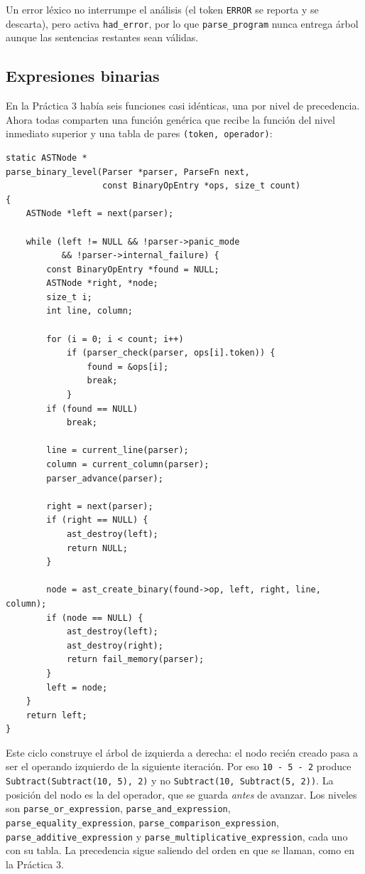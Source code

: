 \documentclass[12pt,letterpaper]{article}
\begin{document}
\bigskip

Un error léxico no interrumpe el análisis (el token \texttt{ERROR} se reporta y se descarta), pero activa
\texttt{had\_error}, por lo que \texttt{parse\_program} nunca entrega árbol aunque las sentencias restantes
sean válidas.

\subsection*{Expresiones binarias}

En la Práctica 3 había seis funciones casi idénticas, una por nivel de precedencia. Ahora todas comparten una
función genérica que recibe la función del nivel inmediato superior y una tabla de pares
\texttt{(token, operador)}:

\begin{lstlisting}[style=modernc, caption={\texttt{parse\_binary\_level}, núcleo de las expresiones binarias.}]
static ASTNode *
parse_binary_level(Parser *parser, ParseFn next,
                   const BinaryOpEntry *ops, size_t count)
{
    ASTNode *left = next(parser);

    while (left != NULL && !parser->panic_mode
           && !parser->internal_failure) {
        const BinaryOpEntry *found = NULL;
        ASTNode *right, *node;
        size_t i;
        int line, column;

        for (i = 0; i < count; i++)
            if (parser_check(parser, ops[i].token)) {
                found = &ops[i];
                break;
            }
        if (found == NULL)
            break;

        line = current_line(parser);
        column = current_column(parser);
        parser_advance(parser);

        right = next(parser);
        if (right == NULL) {
            ast_destroy(left);
            return NULL;
        }

        node = ast_create_binary(found->op, left, right, line, column);
        if (node == NULL) {
            ast_destroy(left);
            ast_destroy(right);
            return fail_memory(parser);
        }
        left = node;
    }
    return left;
}
\end{lstlisting}

\bigskip

Este ciclo construye el árbol de izquierda a derecha: el nodo recién creado pasa a ser el operando izquierdo de
la siguiente iteración. Por eso \texttt{10 - 5 - 2} produce \texttt{Subtract(Subtract(10, 5), 2)} y no
\texttt{Subtract(10, Subtract(5, 2))}. La posición del nodo es la del operador, que se guarda \emph{antes} de
avanzar. Los niveles son \texttt{parse\_or\_expression}, \texttt{parse\_and\_expression},
\texttt{parse\_equality\_expression}, \texttt{parse\_comparison\_expression},
\texttt{parse\_additive\_expression} y \texttt{parse\_multiplicative\_expression}, cada uno con su tabla.
La precedencia sigue saliendo del orden en que se llaman, como en la Práctica 3.
\end{document}
